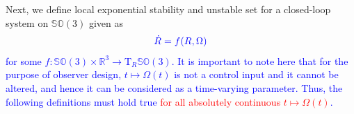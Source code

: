 \documentclass{article}
\newcommand{\SOthree}{\mathbb{SO}(3)}
\newcommand{\R}[1]{\mathbb{R}^{#1}}
\newtheorem{definition}{Definition}
\newcommand{\textblue}[1]{\textcolor{blue}{#1}}
\newcommand{\Rtilde}{\tilde{R}}
\newcommand{\normSOthree}[1]{{{\vert}#1 {\vert}_I}}
\newcommand{\expo}[1]{e^{#1}}
\newcommand{\T}[2]{\text{T}_{#1}{#2}}
\begin{document}
Next, we define local exponential stability and {unstable set} for a closed-loop system on $\SOthree$ given as
\begin{align}\label{eq:CL-rotm}
    \textblue{\dot{R} = f(R, \Omega)}
\end{align}
\textblue{for some $f:\SOthree\times \R{3}\to \T{R}{\SOthree}$. It is important to note here that for the purpose of observer design, $t\mapsto \Omega(t)$ is not a control input and it cannot be altered, and hence it can be considered as a time-varying parameter. Thus, the following definitions must hold true \textcolor{red}{for all absolutely continuous $t\mapsto \Omega(t)$}.}

\end{document}

